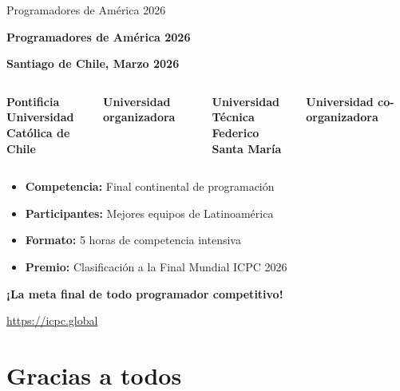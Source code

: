 \documentclass{beamer}
\begin{document}
\begin{frame}{Programadores de América 2026}
\begin{center}
\Large
\textbf{Programadores de América 2026}

\vspace{0.2cm}

\normalsize
\textbf{Santiago de Chile, Marzo 2026}

\vspace{0.2cm}

\begin{columns}[t]
\centering
\textbf{Pontificia Universidad}\\
\textbf{Católica de Chile}

\vspace{0.3cm}

\textbf{Universidad organizadora}

\centering
\textbf{Universidad Técnica}\\
\textbf{Federico Santa María}

\vspace{0.3cm}

\textbf{Universidad co-organizadora}

\end{columns}

\vspace{0.3cm}

\begin{itemize}
\item \textbf{Competencia:} Final continental de programación
\item \textbf{Participantes:} Mejores equipos de Latinoamérica
\item \textbf{Formato:} 5 horas de competencia intensiva
\item \textbf{Premio:} Clasificación a la Final Mundial ICPC 2026
\end{itemize}

\vspace{0.2cm}

\textbf{¡La meta final de todo programador competitivo!}

\small
\url{https://icpc.global}
\end{center}
\end{frame}


\section{Gracias a todos}
\end{document}
